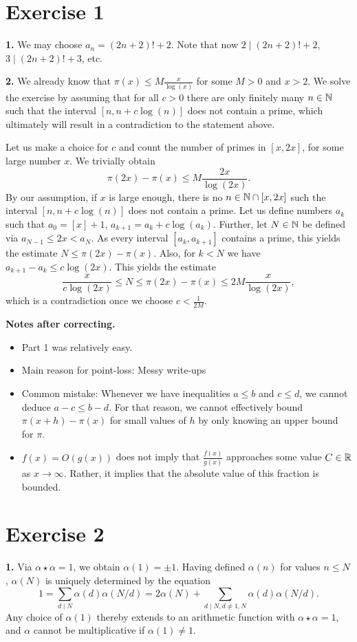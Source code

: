 \documentclass[a4paper,11pt]{article}
\begin{document}
\section*{Exercise 1}
\textbf{1.} We may choose $a_n = (2n+2)!+2$. Note that now $2 \mid (2n+2)!+2$, 
$3 \mid (2n+2)!+3$, etc.

\textbf{2.} We already know that $\pi(x) \leq M \frac{x}{\log(x)}$ for some $M > 0$ 
and $x > 2$. We solve the exercise by assuming that for all $c>0$ there are only
finitely many $n \in \mathbb{N}$ such that the interval $[n, n+c \log(n)]$ does not
contain a prime, which ultimately will result in a contradiction to the statement above.

Let us make a choice for $c$ and count the number of primes in $[x, 2x]$, for
some large number $x$. We trivially obtain 
\[
    \pi(2x)-\pi(x) \leq M \frac{2x}{\log(2x)}.
\]
By our assumption, if $x$ is large enough, there is no $n\in \mathbb{N} \cap[x, 2x]$ such the 
interval $[n, n + c \log(n)]$ does not contain a prime. Let us define numbers 
$a_k$ such that $a_0 = [x]+1$, $a_{k+1} = a_k + c \log(a_k)$. Further, let 
$N\in \mathbb{N}$ be defined via $a_{N-1} \leq 2x < a_N$. As every interval 
$[a_k, a_{k+1}]$ contains a prime, this yields the estimate $N \leq \pi(2x)-\pi(x)$. 
Also, for $k < N$ we have $a_{k+1}-a_k \leq c \log(2x)$.  
This yields the estimate
\[
    \frac x{c \log(2x)} \leq N \leq \pi(2x) - \pi(x)  \leq 2M \frac{x}{\log(2x)},
\]
which is a contradiction once we choose $c < \frac 1{2M}$.

\textbf{Notes after correcting.} \leavevmode
\begin{itemize}
    \item Part 1 was relatively easy.
    \item Main reason for point-loss: Messy write-ups
    \item Common mistake: Whenever we have inequalities $a \leq b$ and $c \leq d$, 
        we cannot deduce $a - c \leq b - d$. For that reason, we cannot effectively 
        bound $\pi(x+h) - \pi(x)$ for small values of $h$ by only knowing an upper 
        bound for $\pi$. 
    \item $f(x) = O(g(x))$ does not imply that $\frac{f(x)}{g(x)}$ approaches some value
        $C \in \mathbb{R}$ as $x \to \infty$. Rather, it implies that the absolute
        value of this fraction is bounded.
\end{itemize}

\section*{Exercise 2}
\textbf{1.} 
Via $\alpha \star \alpha = 1$, we obtain $\alpha(1) = \pm 1$. Having defined 
$\alpha(n)$ for values $n \leq N$, $\alpha(N)$ is uniquely determined by the equation
$$1 = \sum_{d \mid N} \alpha(d)\alpha(N/d) = 2 \alpha(N) + \sum_{d \mid N, d
\neq 1, N} \alpha(d) \alpha(N/d).$$
Any choice of $\alpha(1)$ thereby extends to an arithmetic function with
$\alpha \star \alpha  = 1$, and $\alpha$ cannot be multiplicative if $\alpha(1)
\neq 1$. 
\end{document}
